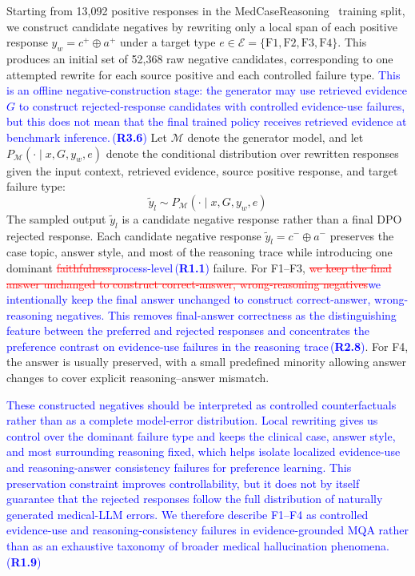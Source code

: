 \documentclass[a4paper,fleqn,doubleblind]{cas-sc}
\DeclareRobustCommand{\deleted}[1]{\textcolor{red}{\sout{#1}}}
\DeclareRobustCommand{\added}[1]{\textcolor{blue}{#1}}
\DeclareRobustCommand{\revtag}[1]{\textcolor{blue}{\scriptsize\,(\textbf{#1})}}
\begin{document}
Starting from 13,092 positive responses in the MedCaseReasoning~\cite{wu2025medcasereasoning} training split, we construct candidate negatives by rewriting only a local span of each positive response $y_w = c^{+} \oplus a^{+}$ under a target type $e \in \mathcal{E} = \{\text{F1}, \text{F2}, \text{F3}, \text{F4}\}$. This produces an initial set of 52,368 raw negative candidates, corresponding to one attempted rewrite for each source positive and each controlled failure type. \added{This is an offline negative-construction stage: the generator may use retrieved evidence $G$ to construct rejected-response candidates with controlled evidence-use failures, but this does not mean that the final trained policy receives retrieved evidence at benchmark inference.}\revtag{R3.6} Let $\mathcal{M}$ denote the generator model, and let $P_{\mathcal{M}}(\cdot \mid x, G, y_w, e)$ denote the conditional distribution over rewritten responses given the input context, retrieved evidence, source positive response, and target failure type:
\begin{equation}
\tilde{y}_l \sim P_{\mathcal{M}}(\cdot \mid x, G, y_w, e)
\end{equation}
The sampled output $\tilde{y}_l$ is a candidate negative response rather than a final DPO rejected response. Each candidate negative response $\tilde{y}_l=c^{-}\oplus a^{-}$ preserves the case topic, answer style, and most of the reasoning trace while introducing one dominant \deleted{faithfulness}\added{process-level}\revtag{R1.1} failure. For F1--F3, \deleted{we keep the final answer unchanged to construct correct-answer, wrong-reasoning negatives}\added{we intentionally keep the final answer unchanged to construct correct-answer, wrong-reasoning negatives. This removes final-answer correctness as the distinguishing feature between the preferred and rejected responses and concentrates the preference contrast on evidence-use failures in the reasoning trace}\revtag{R2.8}. For F4, the answer is usually preserved, with a small predefined minority allowing answer changes to cover explicit reasoning--answer mismatch.

\added{These constructed negatives should be interpreted as controlled counterfactuals rather than as a complete model-error distribution. Local rewriting gives us control over the dominant failure type and keeps the clinical case, answer style, and most surrounding reasoning fixed, which helps isolate localized evidence-use and reasoning-answer consistency failures for preference learning. This preservation constraint improves controllability, but it does not by itself guarantee that the rejected responses follow the full distribution of naturally generated medical-LLM errors. We therefore describe F1--F4 as controlled evidence-use and reasoning-consistency failures in evidence-grounded MQA rather than as an exhaustive taxonomy of broader medical hallucination phenomena.}\revtag{R1.9}
\end{document}
